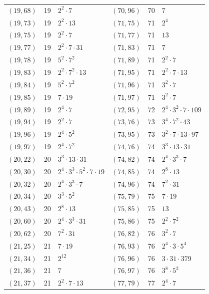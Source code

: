 \documentclass[11pt]{article}
\begin{document}
\begin{longtable}{@{}lrl@{\qquad}lrl@{}}
$(19,68)$ & 19 & $2^{2}\cdot 7$ & $(70,96)$ & 70 & $7$\\
$(19,73)$ & 19 & $2^{2}\cdot 13$ & $(71,75)$ & 71 & $2^{4}$\\
$(19,75)$ & 19 & $2^{2}\cdot 7$ & $(71,77)$ & 71 & $13$\\
$(19,77)$ & 19 & $2^{2}\cdot 7\cdot 31$ & $(71,83)$ & 71 & $7$\\
$(19,78)$ & 19 & $5^{2}\cdot 7^{2}$ & $(71,89)$ & 71 & $2^{2}\cdot 7$\\
$(19,83)$ & 19 & $2^{2}\cdot 7^{2}\cdot 13$ & $(71,95)$ & 71 & $2^{2}\cdot 7\cdot 13$\\
$(19,84)$ & 19 & $5^{2}\cdot 7^{2}$ & $(71,96)$ & 71 & $3^{2}\cdot 7$\\
$(19,85)$ & 19 & $7\cdot 19$ & $(71,97)$ & 71 & $3^{2}\cdot 7$\\
$(19,89)$ & 19 & $2^{4}\cdot 7$ & $(72,95)$ & 72 & $2^{4}\cdot 3^{2}\cdot 7\cdot 109$\\
$(19,94)$ & 19 & $2^{2}\cdot 7$ & $(73,76)$ & 73 & $3^{4}\cdot 7^{2}\cdot 43$\\
$(19,96)$ & 19 & $2^{4}\cdot 5^{2}$ & $(73,95)$ & 73 & $3^{2}\cdot 7\cdot 13\cdot 97$\\
$(19,97)$ & 19 & $2^{4}\cdot 7^{2}$ & $(74,76)$ & 74 & $3^{3}\cdot 13\cdot 31$\\
$(20,22)$ & 20 & $3^{3}\cdot 13\cdot 31$ & $(74,82)$ & 74 & $2^{4}\cdot 3^{3}\cdot 7$\\
$(20,30)$ & 20 & $2^{4}\cdot 3^{3}\cdot 5^{2}\cdot 7\cdot 19$ & $(74,85)$ & 74 & $2^{8}\cdot 13$\\
$(20,32)$ & 20 & $2^{4}\cdot 3^{3}\cdot 7$ & $(74,96)$ & 74 & $7^{2}\cdot 31$\\
$(20,34)$ & 20 & $3^{3}\cdot 5^{2}$ & $(75,79)$ & 75 & $7\cdot 19$\\
$(20,43)$ & 20 & $2^{8}\cdot 13$ & $(75,85)$ & 75 & $13$\\
$(20,60)$ & 20 & $2^{4}\cdot 3^{3}\cdot 31$ & $(75,86)$ & 75 & $2^{2}\cdot 7^{2}$\\
$(20,62)$ & 20 & $7^{2}\cdot 31$ & $(76,82)$ & 76 & $3^{2}\cdot 7$\\
$(21,25)$ & 21 & $7\cdot 19$ & $(76,93)$ & 76 & $2^{4}\cdot 3\cdot 5^{4}$\\
$(21,34)$ & 21 & $2^{12}$ & $(76,96)$ & 76 & $3\cdot 31\cdot 379$\\
$(21,36)$ & 21 & $7$ & $(76,97)$ & 76 & $3^{8}\cdot 5^{2}$\\
$(21,37)$ & 21 & $2^{2}\cdot 7\cdot 13$ & $(77,79)$ & 77 & $2^{4}\cdot 7$\\

\end{longtable}
\end{document}
